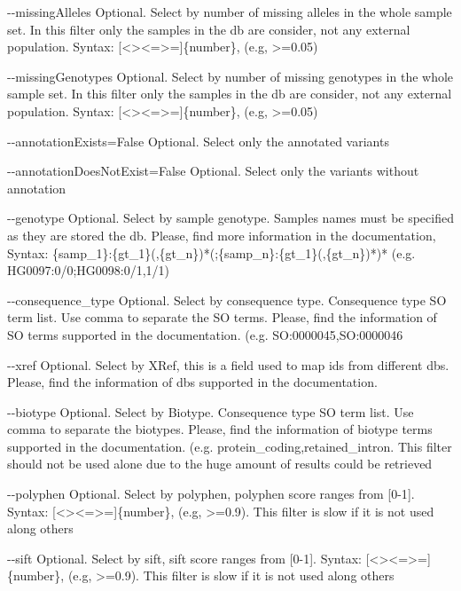 \documentclass[letterpaper,10pt,english]{sphinxmanual}
\begin{document}
\begin{description}
\begin{optionlist}{3cm}
\item [-{-}missingAlleles]  
Optional. Select by number of missing alleles in the whole sample set. In this filter only the samples in the db are consider, not any external population. Syntax: {[}\textless{}\textbar{}\textgreater{}\textbar{}\textless{}=\textbar{}\textgreater{}={]}\{number\}, (e.g, \textgreater{}=0.05)
\item [-{-}missingGenotypes]  
Optional. Select by number of missing genotypes in the whole sample set. In this filter only the samples in the db are consider, not any external population. Syntax: {[}\textless{}\textbar{}\textgreater{}\textbar{}\textless{}=\textbar{}\textgreater{}={]}\{number\}, (e.g, \textgreater{}=0.05)
\item [-{-}annotationExists=False]  
Optional. Select only the annotated variants
\item [-{-}annotationDoesNotExist=False]  
Optional. Select only the variants without annotation
\item [-{-}genotype]  
Optional. Select by sample genotype. Samples names must be specified as they are stored the db. Please, find more information in the documentation, Syntax: \{samp\_1\}:\{gt\_1\}(,\{gt\_n\})*(;\{samp\_n\}:\{gt\_1\}(,\{gt\_n\})*)* (e.g. HG0097:0/0;HG0098:0/1,1/1)
\item [-{-}consequence\_type]  
Optional. Select by consequence type. Consequence type SO term list. Use comma to separate the SO terms. Please, find the information of SO terms supported in the documentation. (e.g. SO:0000045,SO:0000046
\item [-{-}xref]  
Optional. Select by XRef, this is a field used to map ids from different dbs. Please, find the information of dbs supported in the documentation. 
\item [-{-}biotype]  
Optional. Select by Biotype. Consequence type SO term list. Use comma to separate the biotypes. Please, find the information of biotype terms supported in the documentation. (e.g. protein\_coding,retained\_intron. This filter should not be used alone due to the huge amount of results could be retrieved
\item [-{-}polyphen]  
Optional. Select by polyphen, polyphen score ranges from {[}0-1{]}. Syntax: {[}\textless{}\textbar{}\textgreater{}\textbar{}\textless{}=\textbar{}\textgreater{}={]}\{number\}, (e.g, \textgreater{}=0.9). This filter is slow if it is not used along others
\item [-{-}sift]  
Optional. Select by sift, sift score ranges from {[}0-1{]}. Syntax: {[}\textless{}\textbar{}\textgreater{}\textbar{}\textless{}=\textbar{}\textgreater{}={]}\{number\}, (e.g, \textgreater{}=0.9). This filter is slow if it is not used along others

\end{optionlist}
\end{description}
\end{document}
